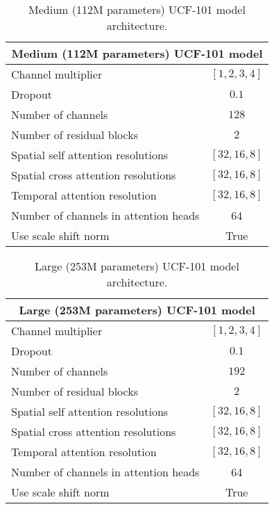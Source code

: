 \documentclass[10pt,twocolumn,letterpaper]{article}
\begin{document}
\begin{table}[!ht]
    \centering
    \caption{Medium (112M parameters) UCF-101 model architecture.}
    \vspace{-1mm}
    \label{tab:ucf_arch_medium}
    \begin{tabular}{l c}
        \toprule
        \multicolumn{2}{c}{Medium (112M parameters) UCF-101 model}\\
        \midrule
        Channel multiplier & $[1, 2, 3, 4]$ \\
        Dropout & $0.1$ \\
        Number of channels & $128$ \\
        Number of residual blocks & $2$ \\
        Spatial self attention resolutions & $[32, 16, 8]$ \\
        Spatial cross attention resolutions & $[32, 16, 8]$ \\
        Temporal attention resolution & $[32, 16, 8]$ \\
        Number of channels in attention heads & 64\\
        Use scale shift norm & True \\
        \bottomrule
    \end{tabular}
\end{table}

\begin{table}[!ht]
    \centering
    \caption{Large (253M parameters) UCF-101 model architecture.}
    \vspace{-1mm}
    \label{tab:ucf_arch_large}
    \begin{tabular}{l c}
        \toprule
        \multicolumn{2}{c}{Large (253M parameters) UCF-101 model}\\
        \midrule
        Channel multiplier & $[1, 2, 3, 4]$ \\
        Dropout & $0.1$ \\
        Number of channels & $192$ \\
        Number of residual blocks & $2$ \\
        Spatial self attention resolutions & $[32, 16, 8]$ \\
        Spatial cross attention resolutions & $[32, 16, 8]$ \\
        Temporal attention resolution & $[32, 16, 8]$ \\
        Number of channels in attention heads & 64\\
        Use scale shift norm & True \\
        \bottomrule
    \end{tabular}
\end{table}
\end{document}
